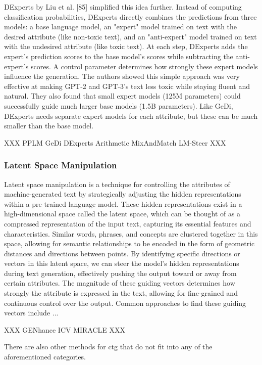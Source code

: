 DExperts by Liu et al. [85] simplified this idea further. 
Instead of computing classification probabilities, DExperts directly combines the predictions from three models: a base language model, an "expert" model trained on text with the desired attribute (like non-toxic text), and an "anti-expert" model trained on text with the undesired attribute (like toxic text). 
At each step, DExperts adds the expert's prediction scores to the base model's scores while subtracting the anti-expert's scores. 
A control parameter determines how strongly these expert models influence the generation. 
The authors showed this simple approach was very effective at making GPT-2 and GPT-3's text less toxic while staying fluent and natural. 
They also found that small expert models (125M parameters) could successfully guide much larger base models (1.5B parameters). 
Like GeDi, DExperts needs separate expert models for each attribute, but these can be much smaller than the base model.

XXX
PPLM
GeDi
DExperts
Arithmetic
MixAndMatch
LM-Steer
XXX

\subsubsection{Latent Space Manipulation}
Latent space manipulation is a technique for controlling the attributes of machine-generated text by strategically adjusting the hidden representations within a pre-trained language model. 
These hidden representations exist in a high-dimensional space called the latent space, which can be thought of as a compressed representation of the input text, capturing its essential features and characteristics.
Similar words, phrases, and concepts are clustered together in this space, allowing for semantic relationships to be encoded in the form of geometric distances and directions between points.
By identifying specific directions or vectors in this latent space, we can steer the model's hidden representations during text generation, effectively pushing the output toward or away from certain attributes.
The magnitude of these guiding vectors determines how strongly the attribute is expressed in the text, allowing for fine-grained and continuous control over the output.
Common approaches to find these guiding vectors include ...

XXX
GENhance
ICV
MIRACLE
XXX

There are also other methods for \gls{ctg} that do not fit into any of the aforementioned categories.

